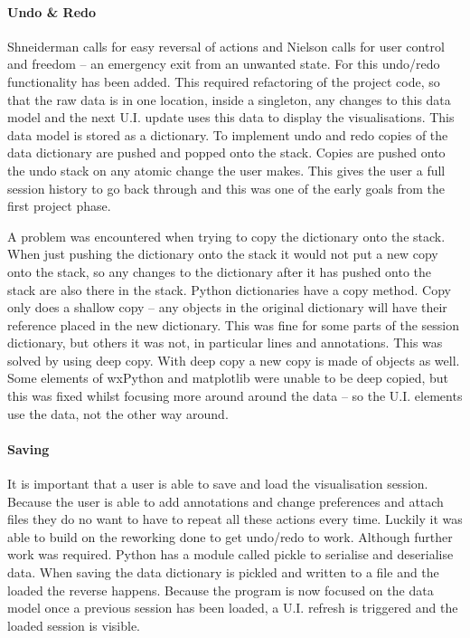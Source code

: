\paragraph{Undo \& Redo}
Shneiderman calls for easy reversal of actions and Nielson calls for user control and freedom -- an emergency exit from an unwanted state.  For this undo/redo functionality has been added.  This required refactoring of the project code, so that the raw data is in one location, inside a singleton, any changes to this data model and the next U.I. update uses this data to display the visualisations.  This data model is stored as a dictionary.  To implement undo and redo copies of the data dictionary are pushed and popped onto the stack.  Copies are pushed onto the undo stack on any atomic change the user makes.  This gives the user a full session history to go back through and this was one of the early goals from the first project phase.

A problem was encountered when trying to copy the dictionary onto the stack.  When just pushing the dictionary onto the stack it would not put a new copy onto the stack, so any changes to the dictionary after it has pushed onto the stack are also there in the stack.  Python dictionaries have a copy method.  Copy only does a shallow copy -- any objects in the original dictionary will have their reference placed in the new dictionary.  This was fine for some parts of the session dictionary, but others it was not, in particular lines and annotations.  This was solved by using deep copy.  With deep copy a new copy is made of objects as well.  Some elements of wxPython and matplotlib were unable to be deep copied, but this was fixed whilst focusing more around around the data -- so the U.I. elements use the data, not the other way around.

\paragraph{Saving}

It is important that a user is able to save and load the visualisation session.  Because the user is able to add annotations and change preferences and attach files they do no want to have to repeat all these actions every time.  Luckily it was able to build on the reworking done to get undo/redo to work.  Although further work was required. Python has a module called pickle to serialise and deserialise data.  When saving the data dictionary is pickled and written to a file and the loaded the reverse happens.  Because the program is now focused on the data model once a previous session has been loaded, a U.I. refresh is triggered and the loaded session is visible.

